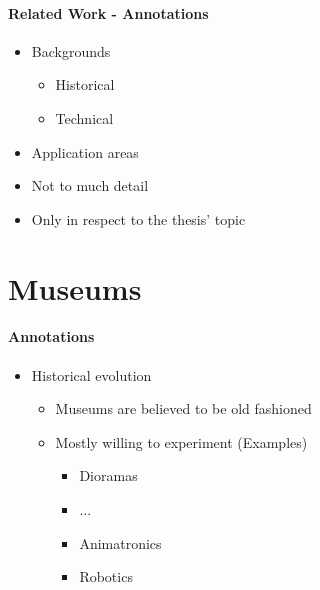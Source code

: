 
\paragraph{Related Work - Annotations}

\begin{itemize}
	\item Backgrounds
	\begin{itemize}
		\item Historical
		\item Technical
	\end{itemize}
	\item Application areas
	\item Not to much detail
	\item Only in respect to the thesis' topic
\end{itemize}


\section{Museums}
\label{motivation_museums}

\paragraph{Annotations}

\begin{itemize}
	\item Historical evolution
	\begin{itemize}
		\item Museums are believed to be old fashioned
		\item Mostly willing to experiment (Examples)
		\begin{itemize}
			\item Dioramas
			\item ...
			\item Animatronics
			\item Robotics
		\end{itemize}
	\end{itemize}
\end{itemize}


